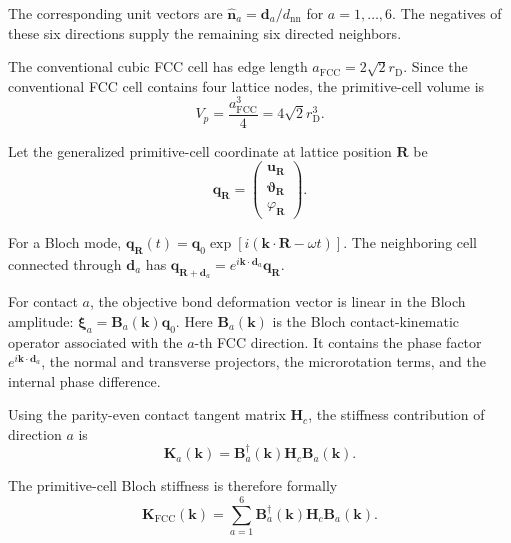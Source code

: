 The corresponding unit vectors are $\hat{\mathbf{n}}_a = \mathbf{d}_a / d_{\mathrm{nn}}$ for $a=1,\ldots,6$. The negatives of these six directions supply the remaining six directed neighbors.

The conventional cubic FCC cell has edge length $a_{\mathrm{FCC}} = 2\sqrt{2}r_{\mathrm{D}}$. Since the conventional FCC cell contains four lattice nodes, the primitive-cell volume is
\begin{equation}
    V_p = \frac{a_{\mathrm{FCC}}^3}{4} = 4\sqrt{2}r_{\mathrm{D}}^3.
\end{equation}

Let the generalized primitive-cell coordinate at lattice position $\mathbf{R}$ be
\begin{equation}
    \mathbf{q}_{\mathbf{R}} =
    \begin{pmatrix}
        \mathbf{u}_{\mathbf{R}} \\
        \boldsymbol{\vartheta}_{\mathbf{R}} \\
        \varphi_{\mathbf{R}}
    \end{pmatrix}.
\end{equation}

For a Bloch mode, $\mathbf{q}_{\mathbf{R}}(t) = \mathbf{q}_0 \exp\left[i(\mathbf{k}\cdot\mathbf{R}-\omega t)\right]$. The neighboring cell connected through $\mathbf{d}_a$ has $\mathbf{q}_{\mathbf{R}+\mathbf{d}_a} = e^{i\mathbf{k}\cdot\mathbf{d}_a} \mathbf{q}_{\mathbf{R}}$.

For contact $a$, the objective bond deformation vector is linear in the Bloch amplitude: $\boldsymbol{\xi}_a = \mathbf{B}_a(\mathbf{k})\mathbf{q}_0$. Here $\mathbf{B}_a(\mathbf{k})$ is the Bloch contact-kinematic operator associated with the $a$-th FCC direction. It contains the phase factor $e^{i\mathbf{k}\cdot\mathbf{d}_a}$, the normal and transverse projectors, the microrotation terms, and the internal phase difference.

Using the parity-even contact tangent matrix $\mathbf{H}_c$, the stiffness contribution of direction $a$ is
\begin{equation}
    \mathbf{K}_a(\mathbf{k}) = \mathbf{B}_a^\dagger(\mathbf{k}) \mathbf{H}_c \mathbf{B}_a(\mathbf{k}).
\end{equation}

The primitive-cell Bloch stiffness is therefore formally
\begin{equation}
    \boxed{ \mathbf{K}_{\mathrm{FCC}}(\mathbf{k}) = \sum_{a=1}^{6} \mathbf{B}_a^\dagger(\mathbf{k}) \mathbf{H}_c \mathbf{B}_a(\mathbf{k}) }.
\end{equation}


